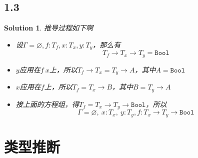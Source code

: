 \documentclass[11pt, a4paper]{article}
\newtheorem{Solution}{Solution}
\let\t\texttt
\let\emptyset\varnothing
\newcommand{\Bool}{\t{Bool}}
\begin{document}
    \subsection*{1.3}
    \begin{Solution}
        推导过程如下啊
        \begin{itemize}
            \item 设$\Gamma=\emptyset, f:T_f, x:T_x, y:T_y$，那么有$$T_f\rightarrow T_x\rightarrow T_y = \Bool$$
            \item $y$应用在$f~x$上，所以$T_f\rightarrow T_x = T_y\rightarrow A$，其中$A=\Bool$
            \item $x$应用在$f$上，所以$T_f = T_x\rightarrow B$，其中$B=T_y\rightarrow A$
            \item 接上面的方程组，得$T_f=T_x\rightarrow T_y\rightarrow \Bool$，所以$$\Gamma =\emptyset,~x:T_x,~y:T_y,f: T_x\rightarrow T_y\rightarrow \Bool$$
        \end{itemize}
    \end{Solution}

\section{类型推断}
\end{document}

